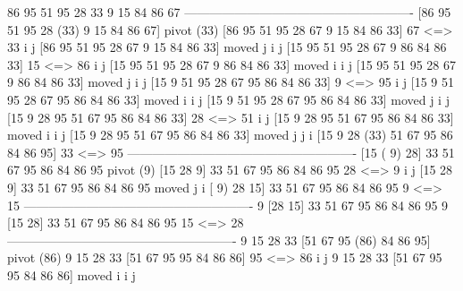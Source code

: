 \begin{codebox}
  86   95   51   95   28   33    9   15   84   86   67 
-------------------------------------------------------
 [86   95   51   95   28  (33)   9   15   84   86   67]  pivot (33)
 [86   95   51   95   28   67    9   15   84   86   33]  67 <=> 33
   i                                            j      
 [86   95   51   95   28   67    9   15   84   86   33]  moved j
   i                                  j                
 [15   95   51   95   28   67    9   86   84   86   33]  15 <=> 86
   i                                  j                
 [15   95   51   95   28   67    9   86   84   86   33]  moved i
        i                             j                
 [15   95   51   95   28   67    9   86   84   86   33]  moved j
        i                        j                     
 [15    9   51   95   28   67   95   86   84   86   33]  9 <=> 95
        i                        j                     
 [15    9   51   95   28   67   95   86   84   86   33]  moved i
             i                   j                     
 [15    9   51   95   28   67   95   86   84   86   33]  moved j
             i         j                               
 [15    9   28   95   51   67   95   86   84   86   33]  28 <=> 51
             i         j                               
 [15    9   28   95   51   67   95   86   84   86   33]  moved i
                  i    j                               
 [15    9   28   95   51   67   95   86   84   86   33]  moved j
             j    i                                    
 [15    9   28  (33)  51   67   95   86   84   86   95]  33 <=> 95
-------------------------------------------------------
 [15  ( 9)  28]  33   51   67   95   86   84   86   95   pivot (9)
 [15   28    9]  33   51   67   95   86   84   86   95   28 <=> 9
   i    j                                              
 [15   28    9]  33   51   67   95   86   84   86   95   moved j
   i                                                   
 [ 9)  28   15]  33   51   67   95   86   84   86   95    9 <=> 15
-------------------------------------------------------
   9  [28   15]  33   51   67   95   86   84   86   95 
   9  [15   28]  33   51   67   95   86   84   86   95   15 <=> 28
-------------------------------------------------------
   9   15   28   33  [51   67   95  (86)  84   86   95]  pivot (86)
   9   15   28   33  [51   67   95   95   84   86   86]  95 <=> 86
                       i                        j      
   9   15   28   33  [51   67   95   95   84   86   86]  moved i
                                 i                   j 

\end{codebox}
